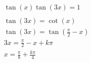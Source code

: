 \documentclass[preview,convert={density=300,outext=.png}]{standalone}
\begin{document}
\begin{align*}
    & \tan(x)\tan(3x) = 1 \\
    & \\
    & \tan(3x) = \cot(x) \\
    & \tan(3x) = \tan(\frac{\pi}{2} - x) \\
    & 3x = \frac{\pi}{2} - x + k\pi \\
    & x = \frac{\pi}{8} + \frac{k\pi}{4} \\
\end{align*}
\end{document}
